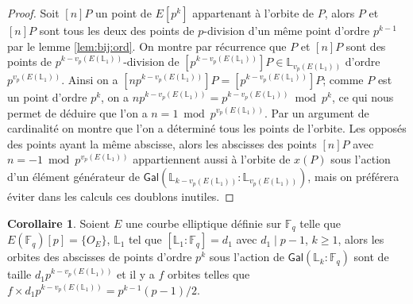 \documentclass[10pt,a4paper]{book}
\theoremstyle{plain}
\theoremstyle{definition}
\theoremstyle{definition}
\newtheorem{cor}[thm]{Corollaire}
\theoremstyle{definition}
\theoremstyle{definition}
\theoremstyle{remark}
\theoremstyle{remark}
\theoremstyle{definition}
\begin{document}
\begin{proof}
Soit $[n]P$ un point de $E[p^k]$ appartenant à l'orbite de $P$, alors $P$ et 
$[n]P$ sont tous les deux des points de $p$-division d'un même point d'ordre 
$p^{k-1}$ par le lemme \ref{lem:bij:ord}. On montre par récurrence que $P$ et 
$[n]P$ sont des points de $p^{k-v_p({E(\mathbb{L}_1)})}$-division de 
$[p^{k-v_p({E(\mathbb{L}_1)})}]P \in \mathbb{L}_{v_p({E(\mathbb{L}_1)})}$ 
d'ordre $p^{v_p(E(\mathbb{L}_1))}$. Ainsi on a $[np^{k-v_p(E(\mathbb{L}_1))}]P=
[p^{k-v_p(E(\mathbb{L}_1))}]P$; comme $P$ est un point d'ordre $p^k$, on a 
$np^{k-v_p(E(\mathbb{L}_1))}=p^{k-v_p(E(\mathbb{L}_1))} \bmod p^k$, ce qui nous 
permet de déduire que l'on a $n=1 \bmod p^{v_p(E(\mathbb{L}_1))}$. Par un 
argument de cardinalité on montre que l'on a déterminé tous les points de 
l'orbite. Les opposés des points ayant la même abscisse, alors les abscisses 
des points $[n]P$ avec $n=-1 \bmod p^{v_p(E(\mathbb{L}_1))}$ appartiennent 
aussi à l'orbite de $x(P)$ sous l'action d'un élément générateur de 
$\mathsf{Gal}(\mathbb{L}_{k-v_p(E(\mathbb{L}_1))}:
\mathbb{L}_{v_p(E(\mathbb{L}_1))})$, mais on préférera éviter dans les calculs 
ces doublons inutiles.
\end{proof}

\begin{cor}
\label{cor:orb:fro}
Soient $E$ une courbe elliptique définie sur $\mathbb{F}_q$ telle que 
$E(\mathbb{F}_q)[p]=\{O_E\}$, $\mathbb{L}_1$ tel que $[\mathbb{L}_1:
\mathbb{F}_q]=d_1$ avec $d_1 \mid p-1$, $k \geqslant 1$, alors les orbites des 
abscisses de points d'ordre $p^k$ sous l'action de $\mathsf{Gal}
(\mathbb{L}_{k}:\mathbb{F}_q)$ sont de taille $d_1 p^{k-v_p(E(\mathbb{L}_1))}$ 
et il y a $f$ orbites telles que $f \times d_1 p^{k-v_p(E(\mathbb{L}_1))} = 
p^{k-1}(p-1)/2$.
\end{cor}

\end{document}
